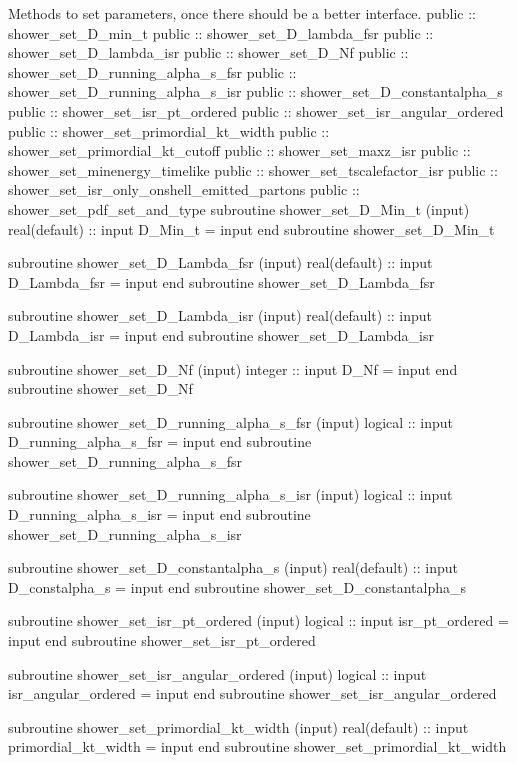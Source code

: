 \eatline
\nwendcode{}Methods to set parameters, once there should be a better interface.
\nwenddocs{}\plusendmoddef
  public :: shower_set_D_min_t
  public :: shower_set_D_lambda_fsr
  public :: shower_set_D_lambda_isr
  public :: shower_set_D_Nf
  public :: shower_set_D_running_alpha_s_fsr
  public :: shower_set_D_running_alpha_s_isr
  public :: shower_set_D_constantalpha_s
  public :: shower_set_isr_pt_ordered
  public :: shower_set_isr_angular_ordered
  public :: shower_set_primordial_kt_width
  public :: shower_set_primordial_kt_cutoff
  public :: shower_set_maxz_isr
  public :: shower_set_minenergy_timelike
  public :: shower_set_tscalefactor_isr
  public :: shower_set_isr_only_onshell_emitted_partons
  public :: shower_set_pdf_set_and_type
\nwendcode{}\plusendmoddef
  subroutine shower_set_D_Min_t (input)
    real(default) :: input
    D_Min_t = input
  end subroutine shower_set_D_Min_t

  subroutine shower_set_D_Lambda_fsr (input)
    real(default) :: input
    D_Lambda_fsr = input
  end subroutine shower_set_D_Lambda_fsr

  subroutine shower_set_D_Lambda_isr (input)
    real(default) :: input
    D_Lambda_isr = input
  end subroutine shower_set_D_Lambda_isr

  subroutine shower_set_D_Nf (input)
    integer :: input
    D_Nf = input
  end subroutine shower_set_D_Nf

  subroutine shower_set_D_running_alpha_s_fsr (input)
    logical :: input
    D_running_alpha_s_fsr = input
  end subroutine shower_set_D_running_alpha_s_fsr

  subroutine shower_set_D_running_alpha_s_isr (input)
    logical :: input
    D_running_alpha_s_isr = input
  end subroutine shower_set_D_running_alpha_s_isr

  subroutine shower_set_D_constantalpha_s (input)
    real(default) :: input
    D_constalpha_s = input
  end subroutine shower_set_D_constantalpha_s

  subroutine shower_set_isr_pt_ordered (input)
    logical :: input
    isr_pt_ordered = input
  end subroutine shower_set_isr_pt_ordered

  subroutine shower_set_isr_angular_ordered (input)
    logical :: input
    isr_angular_ordered = input
  end subroutine shower_set_isr_angular_ordered

  subroutine shower_set_primordial_kt_width (input)
    real(default) :: input
    primordial_kt_width = input
  end subroutine shower_set_primordial_kt_width

